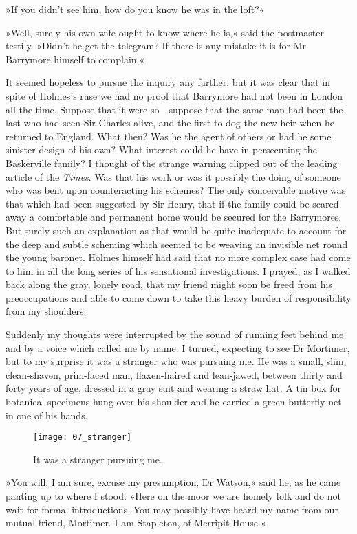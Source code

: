 »If you didn't see him, how do you know he was in the loft?«

»Well, surely his own wife ought to know where he is,« said the postmaster testily. »Didn't he get the telegram? If there is any mistake it is for Mr Barrymore himself to complain.«

It seemed hopeless to pursue the inquiry any farther, but it was clear that in spite of Holmes's ruse we had no proof that Barrymore had not been in London all the time. Suppose that it were so\allowbreak—\allowbreak suppose that the same man had been the last who had seen Sir Charles alive, and the first to dog the new heir when he returned to England. What then? Was he the agent of others or had he some sinister design of his own? What interest could he have in persecuting the Baskerville family? I thought of the strange warning clipped out of the leading article of the \textit{Times}. Was that his work or was it possibly the doing of someone who was bent upon counteracting his schemes? The only conceivable motive was that which had been suggested by Sir Henry, that if the family could be scared away a comfortable and permanent home would be secured for the Barrymores. But surely such an explanation as that would be quite inadequate to account for the deep and subtle scheming which seemed to be weaving an invisible net round the young baronet. Holmes himself had said that no more complex case had come to him in all the long series of his sensational investigations. I prayed, as I walked back along the gray, lonely road, that my friend might soon be freed from his preoccupations and able to come down to take this heavy burden of responsibility from my shoulders.

Suddenly my thoughts were interrupted by the sound of running feet behind me and by a voice which called me by name. I turned, expecting to see Dr Mortimer, but to my surprise it was a stranger who was pursuing me. He was a small, slim, clean-shaven, prim-faced man, flaxen-haired and lean-jawed, between thirty and forty years of age, dressed in a gray suit and wearing a straw hat. A tin box for botanical specimens hung over his shoulder and he carried a green butterfly-net in one of his hands.

\begin{figure}[tbhp]
\centering
\texttt{[image: 07\_stranger]}
\caption{It was a stranger pursuing me.}
\end{figure}

»You will, I am sure, excuse my presumption, Dr Watson,« said he, as he came panting up to where I stood. »Here on the moor we are homely folk and do not wait for formal introductions. You may possibly have heard my name from our mutual friend, Mortimer. I am Stapleton, of Merripit House.«

